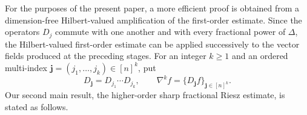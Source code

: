 \documentclass{amsart}
\numberwithin{equation}{section}
\theoremstyle{definition}
\theoremstyle{remark}
\newcommand{\1}{\mathbf 1}
\begin{document}
For the purposes of the present paper, a more efficient proof is obtained
from a dimension-free Hilbert-valued amplification of the first-order
estimate. 
Since the operators $D_{j}$ commute with one another and with
every fractional power of $\Delta$, the Hilbert-valued first-order
estimate can be applied successively to the vector fields produced at
the preceding stages. For an integer $k\geq1$ and an ordered multi-index
$\mathbf j=(j_{1},\ldots,j_{k})\in[n]^{k}$, put
\[
 D_{\mathbf j}=D_{j_{1}}\cdots D_{j_{k}},
 \qquad
 \nabla^kf=\{D_{\mathbf j}f\}_{\mathbf j\in[n]^{k}}.
\]
Our second main result, the higher-order sharp fractional Riesz estimate, is stated as follows.

\end{document}
